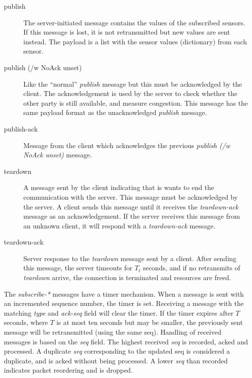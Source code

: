 \documentclass[a4paper]{article}
\begin{document}
\begin{description}
	\item[publish] The server-initiated message contains the values of
	the subscribed sensors. If this message is lost, it is not retransmitted but
	new values are sent instead. The payload is a list with the sensor values 
    (dictionary) from each sensor.
    
	\item[publish (/w NoAck unset)] Like the ``normal'' \emph{publish} message
	but this must be acknowledged by the client. The acknowledgement is used
	by the server to check whether the other party is still	available, and measure
    congestion. This message has the same payload format as the unacknowledged
    \emph{publish} message.
    
	\item[publish-ack] Message from the client which acknowledges the previous
	\emph{publish (/w NoAck unset)} message.
    
	\item[teardown] A message sent by the client indicating that is 
	wants to end the communication with the server. This message must be 
	acknowledged by the server. A client sends this message until it receives 
	the \emph{teardown-ack} message as an acknowledgement. If the server 
	receives this message from an unknown client, it will respond with a
	\emph{teardown-ack} message.
    
	\item[teardown-ack] Server response to the \emph{teardown} message
	sent by a client. After sending this message, the server timeouts for $T_t$
    seconds, and if no retransmits of \emph{teardown} arrive, the connection is
    terminated and resources are freed.
\end{description}

The \emph{subscribe-*} messages have a timer mechanism.
When a message is sent with an incremented sequence number, the timer is set.
Receiving a message with the matching \emph{type} and \emph{ack-seq} field will 
clear the timer. If the timer expires after $T$ seconds, where $T$ is at most
ten seconds but may be smaller, the previously sent message will be retransmitted (using the same seq).
Handling of received messages is based on the \emph{seq} field.
The highest received \emph{seq} is recorded, acked and processed.
A duplicate \emph{seq} corresponding to the updated seq is considered a duplicate, and is acked without being processed.
A lower \emph{seq} than recorded indicates packet reordering and is dropped.
\end{document}
